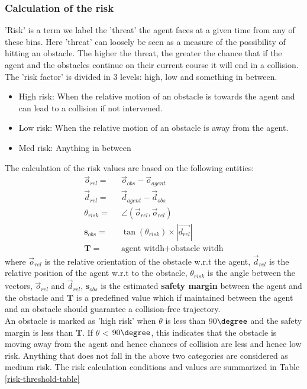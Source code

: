 \subsubsection*{Calculation of the risk}
'Risk' is a term we label the 'threat' the agent faces at a given time from any of these bins. Here 'threat' can loosely be seen as a measure of the possibility of hitting an obstacle. The higher the threat, the greater the chance that if the agent and the obstacles continue on their current course it will end in a collision.
The 'risk factor' is divided in 3 levels: high, low and something in between.
\begin{itemize}
	\item High risk:
When the relative motion of an obstacle is towards the agent and can lead to a collision if not intervened.
	\item Low risk:
When the relative motion of an obstacle is away from the agent.
	\item Med risk:
Anything in between
\end{itemize}
The calculation of the risk values are based on the following entities:
\begin{align}
	\vec{o}_{rel} = & \;\; \vec{o}_{obs} - \vec{o}_{agent}  \\
	\vec{d}_{rel} =  &\;\; \vec{d}_{agent} - \vec{d}_{obs} \\
	\theta_{risk} =  & \;\; \angle (\vec{o}_{rel}, \vec{o}_{rel}) \\
	\mathbf{s}_{obs} = & \;\; \tan(\theta_{risk}) \times |\vec{d_{rel}}| \\
	\mathbf{T} = & \;\; \text{agent witdh} + \text{obstacle witdh}
\end{align}
where $\vec{o}_{rel}$ is the relative orientation of the obstacle w.r.t the agent, $\vec{d}_{rel}$ is the relative position of the agent w.r.t to the obstacle, $\theta_{risk}$ is the angle between the vectors, $\vec{o}_{rel}$ and $\vec{d}_{rel}$,  $\mathbf{s}_{obs}$ is the estimated \textbf{safety margin} between the agent and the obstacle and $\mathbf{T}$ is a predefined value which if maintained between the agent and an obstacle should guarantee a collision-free trajectory.\\
An obstacle is marked as 'high risk' when $\theta$ is less than $90\degree$ and the safety margin is less than $\mathbf{T}$. If $\theta$ < $90 \degree$, this indicates that the obstacle is moving away from the agent and hence chances of collision are less and hence low risk. Anything that does not fall in the above two categories are considered as medium risk. The risk calculation conditions and values are summarized in Table \ref{risk-threshold-table}

